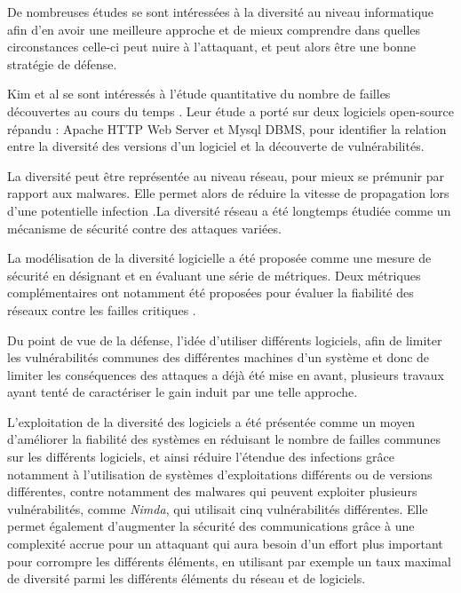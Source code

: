 De nombreuses études se sont intéressées à la diversité au niveau informatique afin d'en avoir une meilleure approche et de mieux comprendre dans quelles circonstances celle-ci peut nuire à l’attaquant, et peut alors être une bonne stratégie de défense.

Kim et al se sont intéressés à l’étude quantitative du nombre de failles découvertes au cours du temps \cite{vulnerabilityDiscovery}. Leur étude a porté sur deux logiciels open-source répandu : Apache HTTP Web Server et Mysql DBMS, pour identifier la relation entre la diversité des versions d’un logiciel et la découverte de vulnérabilités.

La diversité peut être représentée au niveau réseau, pour mieux se prémunir par rapport aux malwares. Elle permet alors de réduire la vitesse de propagation lors d’une potentielle infection \cite{OptimisingNetwork}.La diversité réseau a été longtemps étudiée comme un mécanisme de sécurité contre des attaques variées.

La modélisation de la diversité logicielle a été proposée comme une mesure de sécurité en désignant et en évaluant une série de métriques. Deux métriques complémentaires ont notamment été proposées pour évaluer la fiabilité des réseaux contre les failles critiques \cite{networkDiversity}.

Du point de vue de la défense, l'idée d'utiliser différents logiciels, afin de limiter les vulnérabilités communes des différentes machines d’un système et donc de limiter les conséquences des attaques a déjà été mise en avant, plusieurs travaux ayant tenté de caractériser le gain induit par une telle approche\cite{softwareDiversity:Security}.

L'exploitation de la diversité des logiciels a été présentée comme un moyen d'améliorer la fiabilité des systèmes en réduisant le
nombre de failles communes sur les différents logiciels, et ainsi réduire l’étendue des infections grâce notamment à l’utilisation de systèmes d'exploitations différents ou de versions différentes,\cite{softwareDiversityPracticalStatistics}
contre notamment des malwares qui peuvent exploiter plusieurs vulnérabilités, comme \textit{Nimda}, qui utilisait cinq vulnérabilités différentes. 
Elle permet également d'augmenter la sécurité des communications grâce à une complexité accrue pour un attaquant qui aura besoin d’un effort plus important pour corrompre les différents éléments, en utilisant par exemple un taux maximal de diversité\cite{maximalRatio} parmi les différents éléments du réseau et de logiciels. 

